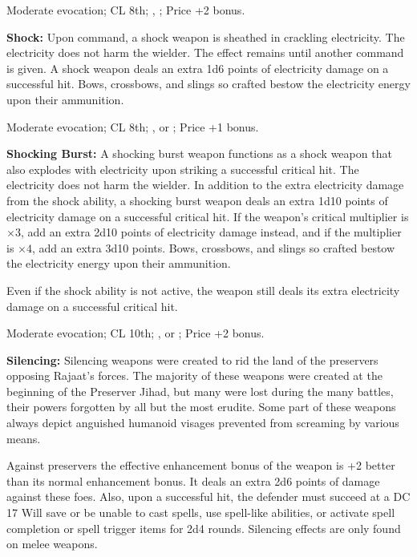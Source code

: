 Moderate evocation; CL 8th; , ; Price +2 bonus.

\textbf{Shock:} Upon command, a shock weapon is sheathed in crackling electricity. The electricity does not harm the wielder. The effect remains until another command is given. A shock weapon deals an extra 1d6 points of electricity damage on a successful hit. Bows, crossbows, and slings so crafted bestow the electricity energy upon their ammunition.

Moderate evocation; CL 8th; ,  or ; Price +1 bonus.

\textbf{Shocking Burst:} A shocking burst weapon functions as a shock weapon that also explodes with electricity upon striking a successful critical hit. The electricity does not harm the wielder. In addition to the extra electricity damage from the shock ability, a shocking burst weapon deals an extra 1d10 points of electricity damage on a successful critical hit. If the weapon's critical multiplier is $\times3$, add an extra 2d10 points of electricity damage instead, and if the multiplier is $\times4$, add an extra 3d10 points. Bows, crossbows, and slings so crafted bestow the electricity energy upon their ammunition.

Even if the shock ability is not active, the weapon still deals its extra electricity damage on a successful critical hit.

Moderate evocation; CL 10th; ,  or ; Price +2 bonus.

\textbf{Silencing:} Silencing weapons were created to rid the land of the preservers opposing Rajaat’s forces. The majority of these weapons were created at the beginning of the Preserver Jihad, but many were lost during the many battles, their powers forgotten by all but the most erudite. Some part of these weapons always depict anguished humanoid visages prevented from screaming by various means.

Against preservers the effective enhancement bonus of the weapon is +2 better than its normal enhancement bonus. It deals an extra 2d6 points of damage against these foes. Also, upon a successful hit, the defender must succeed at a DC 17 Will save or be unable to cast spells, use spell-like abilities, or activate spell completion or spell trigger items for 2d4 rounds. Silencing effects are only found on melee weapons.

